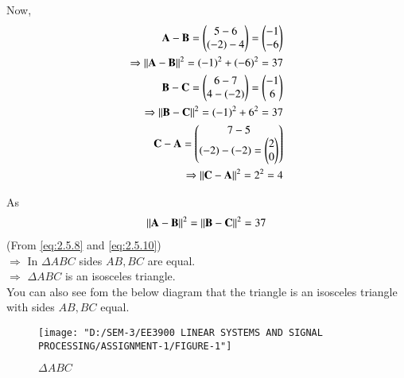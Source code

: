 \documentclass[journal,12pt,twocolumn]{IEEEtran}
\begin{document}
Now,\\
\begin{align}
	\mathbf{A-B} = \begin{pmatrix}5-6 \\ (-2)-4\end{pmatrix} = \begin{pmatrix}-1 \\ -6\end{pmatrix} \label{eq:2.5.7}\\
\Rightarrow \left\lVert\mathbf{A-B}\right\rVert^{2} = (-1)^{2}+(-6)^{2} = 37 \label{eq:2.5.8}\\
\mathbf{B-C} = \begin{pmatrix}6-7 \\ 4-(-2)\end{pmatrix} = \begin{pmatrix}-1 \\ 6\end{pmatrix} \label{eq:2.5.9}\\
\Rightarrow \left\lVert\mathbf{B-C}\right\rVert^{2} = (-1)^{2}+6^{2} = 37 \label{eq:2.5.10}\\
\mathbf{C-A} = \begin{pmatrix}7-5 \\ (-2)-(-2) = \begin{pmatrix}2 \\ 0\end{pmatrix}\end{pmatrix} \label{eq:2.5.11}\\
\Rightarrow \left\lVert\mathbf{C-A}\right\rVert^{2} = 2^{2} = 4 \label{eq:2.5.12}
\end{align}
 
 As 
\begin{align}
	 \left\lVert\mathbf{A-B}\right\rVert^{2} = \left\lVert\mathbf{B-C}\right\rVert^{2} = 37 \label{eq:2.5.13}
\end{align}
(From \eqref{eq:2.5.8} and \eqref{eq:2.5.10})\\
 $\Rightarrow$ In $\Delta ABC$ sides $AB, BC$ are equal.\\
 $\Rightarrow$ $\Delta ABC$ is an isosceles triangle.\\
 
 You can also see fom the below diagram that the triangle is an isosceles triangle with sides $AB, BC$ equal.
 
 \begin{figure}[h]
 	\centering
 	\texttt{[image: "D:/SEM-3/EE3900 LINEAR SYSTEMS AND SIGNAL PROCESSING/ASSIGNMENT-1/FIGURE-1"]}
 	\caption{$\Delta ABC$}
 	\label{fig:2.5}
 \end{figure}
\end{document}
